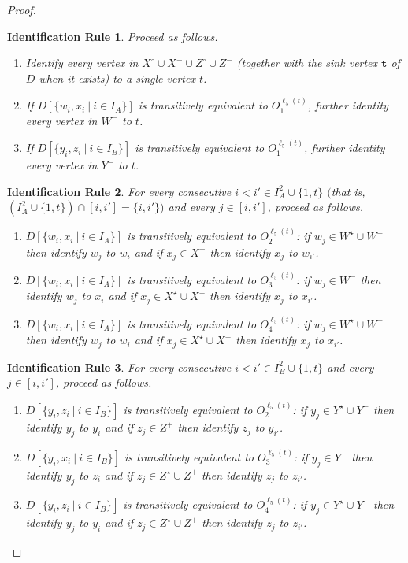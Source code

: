 \documentclass[a4paper,11pt]{article}
\theoremstyle{plain}
\newtheorem{identification rule}{Identification Rule}
\theoremstyle{definition}
\theoremstyle{remark}
\newcommand{\ttt}{\texttt{t}}
\begin{document}
\begin{proof}
\begin{identification rule}
\label{ir:sink}
Proceed as follows.
\begin{enumerate}[nosep]
\item Identify every vertex in $X^\circ \cup X^- \cup Z^\circ \cup Z^-$ (together with the sink vertex $\ttt$ of $D$ when it exists) to a single vertex $t$.
\item If $D[\{w_i,x_i~|~i \in I_A\}]$ is transitively equivalent to $O_1^{\ell_5(t)}$, further identity every vertex in $W^-$ to $t$.
\item If $D[\{y_i,z_i~|~i \in I_B\}]$ is transitively equivalent to $O_1^{\ell_5(t)}$, further identity every vertex in $Y^-$ to $t$.
\end{enumerate}
\end{identification rule}

\begin{identification rule}
\label{ir:WX}
For every consecutive $i < i' \in I_A^2 \cup \{1,t\}$ $($that is, $(I_A^2 \cup \{1,t\}) \cap [i,i'] = \{i,i'\})$ and every $j \in[i,i']$, proceed as follows.
\begin{enumerate}[nosep]
\item $D[\{w_i,x_i~|~i \in I_A\}]$ is transitively equivalent to $O_2^{\ell_5(t)}$: 
if $w_j \in W^\star \cup W^-$ then identify $w_j$ to $w_i$ and if $x_j \in X^+$ then identify $x_j$ to $w_{i'}$.
\item $D[\{w_i,x_i~|~i \in I_A\}]$ is transitively equivalent to $O_3^{\ell_5(t)}$:
if $w_j \in W^-$ then identify $w_j$ to $x_i$ and if $x_j \in X^\star \cup X^+$ then identify $x_j$ to $x_{i'}$.
\item $D[\{w_i,x_i~|~i \in I_A\}]$ is transitively equivalent to $O_4^{\ell_5(t)}$: 
if $w_j \in W^\star \cup W^-$ then identify $w_j$ to $w_i$ and if $x_j \in X^\star \cup X^+$ then identify $x_j$ to $x_{i'}$.
\end{enumerate}
\end{identification rule}

\begin{identification rule}
\label{ir:YZ}
For every consecutive $i < i' \in I_B^2 \cup \{1,t\}$ and every $j \in[i,i']$, proceed as follows.
\begin{enumerate}[nosep]
\item $D[\{y_i,z_i~|~i \in I_B\}]$ is transitively equivalent to $O_2^{\ell_5(t)}$: 
if $y_j \in Y^\star \cup Y^-$ then identify $y_j$ to $y_i$ and if $z_j \in Z^+$ then identify $z_j$ to $y_{i'}$.
\item $D[\{y_i,x_i~|~i \in I_B\}]$ is transitively equivalent to $O_3^{\ell_5(t)}$:
if $y_j \in Y^-$ then identify $y_j$ to $z_i$ and if $z_j \in Z^\star \cup Z^+$ then identify $z_j$ to $z_{i'}$.
\item $D[\{y_i,z_i~|~i \in I_B\}]$ is transitively equivalent to $O_4^{\ell_5(t)}$: 
if $y_j \in Y^\star \cup Y^-$ then identify $y_j$ to $y_i$ and if $z_j \in Z^\star \cup Z^+$ then identify $z_j$ to $z_{i'}$.
\end{enumerate}
\end{identification rule}


\end{proof}
\end{document}

